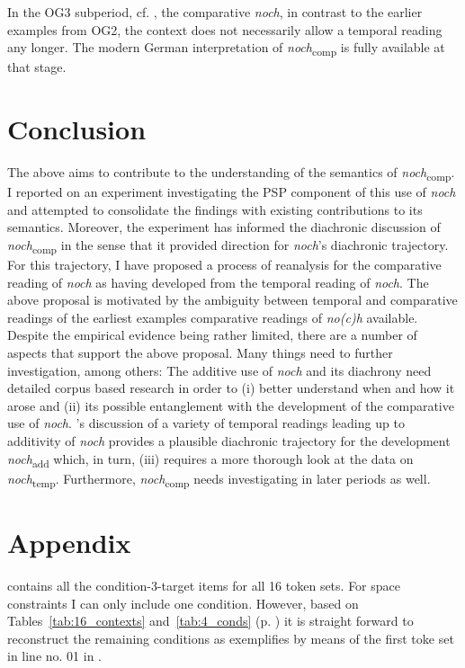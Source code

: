 \documentclass[output=paper,
modfonts
]{langscibook}
\begin{document}
In the OG3 subperiod, cf. , the comparative \textit{noch}, in contrast to the earlier examples from OG2, the context does not necessarily allow a temporal reading any longer. The modern German interpretation of \textit{noch}\textsubscript{comp} is fully available at that stage.

\section{Conclusion}

The above aims to contribute to the understanding of the semantics of \textit{noch}\textsubscript{comp}. I reported on an experiment investigating the PSP component of this use of \textit{noch} and attempted to consolidate the findings with existing contributions to its semantics. Moreover, the experiment has informed the diachronic discussion of \textit{noch}\textsubscript{comp} in the sense that it provided direction for \textit{noch}'s diachronic trajectory. For this trajectory, I have proposed a process of reanalysis for the comparative reading of \textit{noch} as having developed from the temporal reading of \textit{noch}. The above proposal is motivated by the ambiguity between temporal and comparative readings of the earliest examples comparative readings of \textit{no(c)h} available. Despite the empirical evidence being rather limited, there are a number of aspects that support the above proposal. Many things need to further investigation, among others: The additive use of \textit{noch} and its diachrony need detailed corpus based research in order to (i) better understand when and how it arose and (ii) its possible entanglement with the development of the comparative use of \textit{noch}. \citeauthor{beck2016a_sub}'s \citeyearpar{beck2016a_sub} discussion of a variety of temporal readings leading up to additivity of \textit{noch} provides a plausible diachronic trajectory for the development \textit{noch}\textsubscript{add} which, in turn, (iii) requires a more thorough look at the data on \textit{noch}\textsubscript{temp}. Furthermore, \textit{noch}\textsubscript{comp} needs investigating in later periods as well.


{\sloppy\printbibliography[heading=subbibliography,notkeyword=this]}



\section*{Appendix}
 contains all the condition-3-target items for all 16 token sets. For space constraints I can only include one condition. However, based on Tables~\ref{tab:16_contexts} and~\ref{tab:4_conds} (p. \pageref{tab:4_conds}) it is straight forward to reconstruct the remaining conditions as  exemplifies by means of the first toke set in line no. 01 in .
\end{document}
